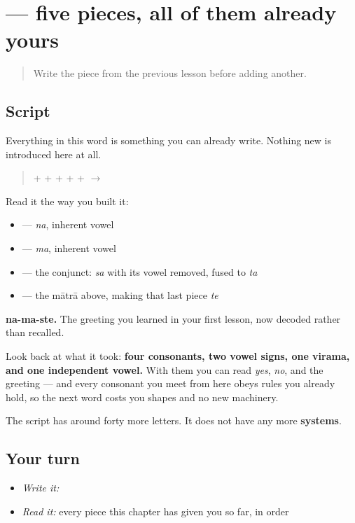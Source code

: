 \section[namaste]{ — five pieces, all of them already yours}

\label{lesson:GU-W01-namaste-read}



\begin{quote}
Write the piece from the previous lesson before adding another.
\end{quote}

\subsection*{Script}
Everything in this word is something you can already write. Nothing new is introduced here at all.

\begin{quote}
\textbf{} + \textbf{} + \textbf{} + \textbf{} + \textbf{} + \textbf{} $\to$ \textbf{}
\end{quote}

Read it the way you built it:

\begin{itemize}
\raggedright
  \item \textbf{} — \emph{na}, inherent vowel
  \item \textbf{} — \emph{ma}, inherent vowel
  \item \textbf{} — the conjunct: \emph{sa} with its vowel removed, fused to \emph{ta}
  \item \textbf{} — the mātrā above, making that last piece \emph{te}
\end{itemize}

\textbf{na-ma-ste.} The greeting you learned in your first lesson, now decoded rather than recalled.

Look back at what it took: \textbf{four consonants, two vowel signs, one virama, and one independent vowel.} With them you can read \emph{yes}, \emph{no}, and the greeting — and every consonant you meet from here obeys rules you already hold, so the next word costs you shapes and no new machinery.

The script has around forty more letters. It does not have any more \textbf{systems}.

\subsection*{Your turn}
\begin{itemize}
\raggedright
  \item \emph{Write it:} 
  \item \emph{Read it:} every piece this chapter has given you so far, in order
\end{itemize}

